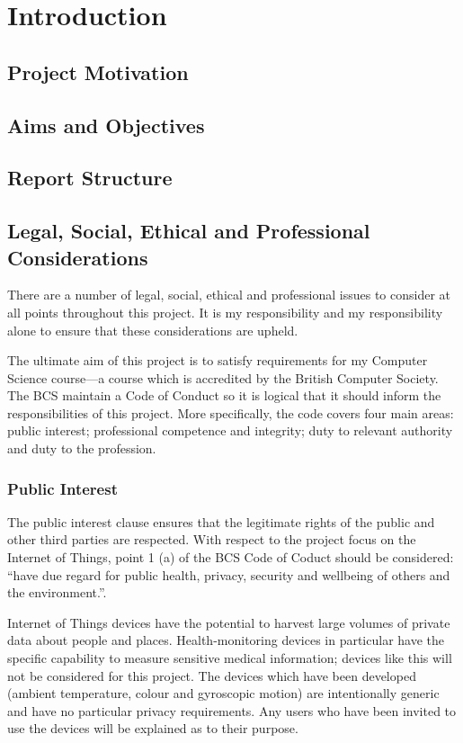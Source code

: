\chapter{Introduction}
  \section{Project Motivation}
  \section{Aims and Objectives}
  \section{Report Structure}

  \section{Legal, Social, Ethical and Professional Considerations}
  \label{chapter:profession-considerations}
    There are a number of legal, social, ethical and professional issues to consider at all points throughout this project. It is my responsibility and my responsibility alone to ensure that these considerations are upheld.

    The ultimate aim of this project is to satisfy requirements for my Computer Science course---a course which is accredited by the British Computer Society. The BCS maintain a Code of Conduct \citep{bcs-coc} so it is logical that it should inform the responsibilities of this project. More specifically, the code covers four main areas: public interest; professional competence and integrity; duty to relevant authority and duty to the profession.

    \subsection{Public Interest}
      The public interest clause ensures that the legitimate rights of the public and other third parties are respected. With respect to the project focus on the Internet of Things, point 1 (a) of the BCS Code of Coduct should be considered: ``have due regard for public health, privacy, security and wellbeing of others and the environment.''.

      Internet of Things devices have the potential to harvest large volumes of private data about people and places. Health-monitoring devices in particular have the specific capability to measure sensitive medical information; devices like this will not be considered for this project. The devices which have been developed (ambient temperature, colour and gyroscopic motion) are intentionally generic and have no particular privacy requirements. Any users who have been invited to use the devices will be explained as to their purpose.

